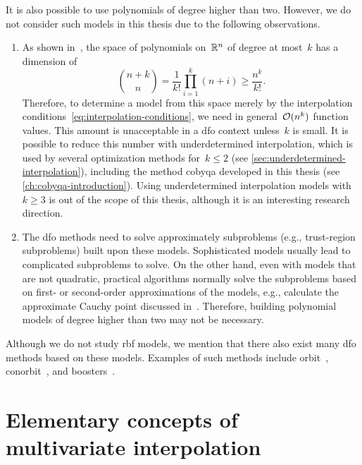 It is also possible to use polynomials of degree higher than two.
However, we do not consider such models in this thesis due to the following observations.
\begin{enumerate}
    \item As shown in~\cite[Thm.~2.5]{Wendland_2005}, the space of polynomials on~$\mathbb{R}^n$ of degree at most~$k$ has a dimension of
    \begin{equation*}
        \binom{n + k}{n} = \frac{1}{k!} \prod_{i = 1}^k (n + i) \ge \frac{n^k}{k!}.
    \end{equation*}
    Therefore, to determine a model from this space merely by the interpolation conditions~\cref{eq:interpolation-conditions}, we need in general~$\operatorname{\mathcal{O}}(n^k)$ function values.
    This amount is unacceptable in a \gls{dfo} context unless~$k$ is small.
    It is possible to reduce this number with underdetermined interpolation, which is used by several optimization methods for~$k \le 2$ (see \cref{sec:underdetermined-interpolation}), including the method \gls{cobyqa} developed in this thesis (see \cref{ch:cobyqa-introduction}).
    Using underdetermined interpolation models with~$k \ge 3$ is out of the scope of this thesis, although it is an interesting research direction.
    \item The \gls{dfo} methods need to solve approximately subproblems (e.g., trust-region subproblems) built upon these models.
    Sophisticated models usually lead to complicated subproblems to solve.
    On the other hand, even with models that are not quadratic, practical algorithms normally solve the subproblems based on first- or second-order approximations of the models, e.g., calculate the approximate Cauchy point discussed in~\cite[\S~6.3.3]{Conn_Gould_Toint_2000}.
    Therefore, building polynomial models of degree higher than two may not be necessary.
\end{enumerate}

Although we do not study \gls{rbf} models, we mention that there also exist many \gls{dfo} methods based on these models.
Examples of such methods include \gls{orbit}~\cite{Wild_Regis_Shoemaker_2008}, \gls{conorbit}~\cite{Regis_Wild_2017}, and \gls{boosters}~\cite{Oeuvray_Bierlaire_2009}.

\section{Elementary concepts of multivariate interpolation}
\label{sec:multivariate-interpolation}

